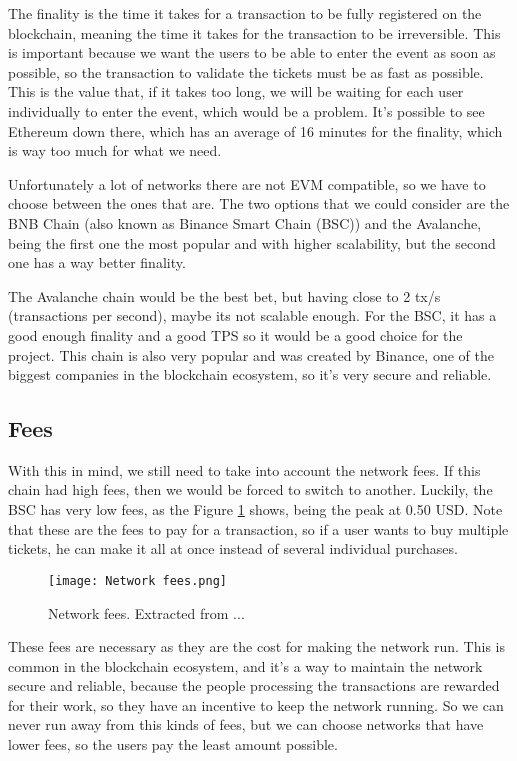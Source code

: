 The finality is the time it takes for a transaction to be fully registered on
the blockchain, meaning the time it takes for the transaction to be
irreversible. This is important because we want the users to be able to enter
the event as soon as possible, so the transaction to validate the tickets must
be as fast as possible. This is the value that, if it takes too long, we will
be waiting for each user individually to enter the event, which would be a
problem. It's possible to see Ethereum down there, which has an average of 16
minutes for the finality, which is way too much for what we need.

Unfortunately a lot of networks there are not EVM compatible, so we have to
choose between the ones that are. The two options that we could consider are
the BNB Chain (also known as Binance Smart Chain (BSC)) and the Avalanche,
being the first one the most popular and with higher scalability, but the
second one has a way better finality.

The Avalanche chain would be the best bet, but having close to 2 tx/s
(transactions per second), maybe its not scalable enough. For the BSC, it has a
good enough finality and a good TPS so it would be a good choice for the
project. This chain is also very popular and was created by Binance, one of the
biggest companies in the blockchain ecosystem, so it's very secure and
reliable.

\subsection{Fees}
\label{subsec:fees}

With this in mind, we still need to take into account the network fees. If this
chain had high fees, then we would be forced to switch to another. Luckily, the
BSC has very low fees, as the Figure \ref{fig:network_fees} shows, being the
peak at 0.50 USD. Note that these are the fees to pay for a transaction, so if
a user wants to buy multiple tickets, he can make it all at once instead of
several individual purchases.

\begin{figure}[H]
	\texttt{[image: Network fees.png]}
	\centering
	\caption{Network fees. Extracted from ...}
	\label{fig:network_fees}
\end{figure}

These fees are necessary as they are the cost for making the network run. This
is common in the blockchain ecosystem, and it's a way to maintain the network
secure and reliable, because the people processing the transactions are
rewarded for their work, so they have an incentive to keep the network running.
So we can never run away from this kinds of fees, but we can choose networks
that have lower fees, so the users pay the least amount possible.

